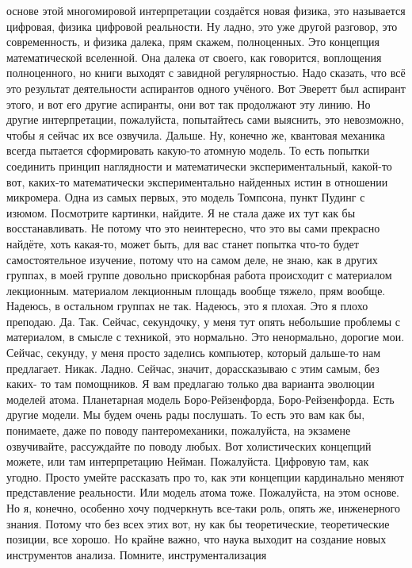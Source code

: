 основе этой многомировой интерпретации создаётся новая физика, это называется
цифровая, физика цифровой реальности. Ну ладно, это уже другой разговор, это
современность, и физика далека, прям скажем, полноценных. Это концепция
математической вселенной. Она далека от своего, как говорится, воплощения
полноценного, но книги выходят с завидной регулярностью. Надо сказать, что всё
это результат деятельности аспирантов одного учёного. Вот Эверетт был аспирант
этого, и вот его другие аспиранты, они вот так продолжают эту линию. Но другие
интерпретации, пожалуйста, попытайтесь сами выяснить, это невозможно, чтобы я
сейчас их все озвучила. Дальше. Ну, конечно же, квантовая механика всегда
пытается сформировать какую-то атомную модель. То есть попытки соединить принцип
наглядности и математически экспериментальный, какой-то вот, каких-то
математически экспериментально найденных истин в отношении микромера. Одна из
самых первых, это модель Томпсона, пункт Пудинг с изюмом. Посмотрите картинки,
найдите. Я не стала даже их тут как бы восстанавливать. Не потому что это
неинтересно, что это вы сами прекрасно найдёте, хоть какая-то, может быть, для
вас станет попытка что-то будет самостоятельное изучение, потому что на самом
деле, не знаю, как в других группах, в моей группе довольно прискорбная работа
происходит с материалом лекционным. материалом лекционным площадь вообще тяжело,
прям вообще. Надеюсь, в остальном группах не так. Надеюсь, это я плохая. Это я
плохо преподаю. Да. Так. Сейчас, секундочку, у меня тут опять небольшие проблемы
с материалом, в смысле с техникой, это нормально. Это ненормально, дорогие мои.
Сейчас, секунду, у меня просто заделись компьютер, который дальше-то нам
предлагает. Никак. Ладно. Сейчас, значит, дорассказываю с этим самым, без каких-
то там помощников. Я вам предлагаю только два варианта эволюции моделей атома.
Планетарная модель Боро-Рейзенфорда, Боро-Рейзенфорда. Есть другие модели. Мы
будем очень рады послушать. То есть это вам как бы, понимаете, даже по поводу
пантеромеханики, пожалуйста, на экзамене озвучивайте, рассуждайте по поводу
любых. Вот холистических концепций можете, или там интерпретацию Нейман.
Пожалуйста. Цифровую там, как угодно. Просто умейте рассказать про то, как эти
концепции кардинально меняют представление реальности. Или модель атома тоже.
Пожалуйста, на этом основе. Но я, конечно, особенно хочу подчеркнуть все-таки
роль, опять же, инженерного знания. Потому что без всех этих вот, ну как бы
теоретические, теоретические позиции, все хорошо. Но крайне важно, что наука
выходит на создание новых инструментов анализа. Помните, инструментализация
